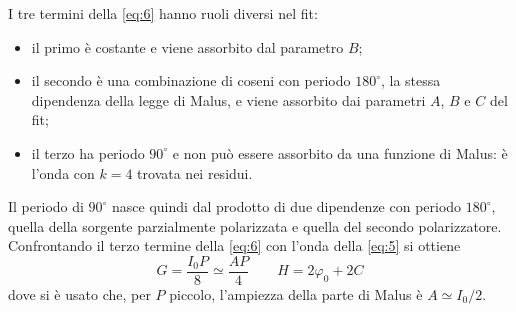 \documentclass[10pt,twocolumn]{article}
\begin{document}
      I tre termini della \ref{eq:6} hanno ruoli diversi nel fit:
      \begin{itemize}
        \item il primo è costante e viene assorbito dal parametro $B$;
        \item il secondo è una combinazione di coseni con periodo $180^\circ$, la stessa dipendenza della legge di Malus, e viene assorbito dai parametri $A$, $B$ e $C$ del fit;
        \item il terzo ha periodo $90^\circ$ e non può essere assorbito da una funzione di Malus: è l'onda con $k = 4$ trovata nei residui.
      \end{itemize}
      Il periodo di $90^\circ$ nasce quindi dal prodotto di due dipendenze con periodo $180^\circ$, quella della sorgente parzialmente polarizzata e quella del secondo polarizzatore.
       Confrontando il terzo termine della \ref{eq:6} con l'onda della \ref{eq:5} si ottiene
      \begin{equation}
        G = \frac{I_0 P}{8} \simeq \frac{A P}{4} \qquad H = 2\varphi_0 + 2C
      \end{equation}
      dove si è usato che, per $P$ piccolo, l'ampiezza della parte di Malus è $A \simeq I_0/2$. 
 \newline
\end{document}
